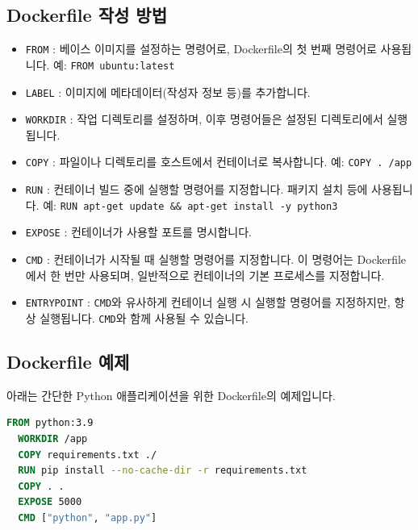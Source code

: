 \documentclass{article}
\begin{document}
\subsection*{Dockerfile 작성 방법}

\begin{itemize}
    \item \texttt{FROM} : 베이스 이미지를 설정하는 명령어로, Dockerfile의 첫 번째 명령어로 사용됩니다. 예: \texttt{FROM ubuntu:latest}
    \item \texttt{LABEL} : 이미지에 메타데이터(작성자 정보 등)를 추가합니다.
    \item \texttt{WORKDIR} : 작업 디렉토리를 설정하며, 이후 명령어들은 설정된 디렉토리에서 실행됩니다.
    \item \texttt{COPY} : 파일이나 디렉토리를 호스트에서 컨테이너로 복사합니다. 예: \texttt{COPY . /app}
    \item \texttt{RUN} : 컨테이너 빌드 중에 실행할 명령어를 지정합니다. 패키지 설치 등에 사용됩니다. 예: \texttt{RUN apt-get update \&\& apt-get install -y python3}
    \item \texttt{EXPOSE} : 컨테이너가 사용할 포트를 명시합니다.
    \item \texttt{CMD} : 컨테이너가 시작될 때 실행할 명령어를 지정합니다. 이 명령어는 Dockerfile에서 한 번만 사용되며, 일반적으로 컨테이너의 기본 프로세스를 지정합니다.
    \item \texttt{ENTRYPOINT} : \texttt{CMD}와 유사하게 컨테이너 실행 시 실행할 명령어를 지정하지만, 항상 실행됩니다. \texttt{CMD}와 함께 사용될 수 있습니다.
\end{itemize}

\subsection*{Dockerfile 예제}
아래는 간단한 Python 애플리케이션을 위한 Dockerfile의 예제입니다.

\begin{lstlisting}[language=dockerfile, caption={Python Dockerfile 예제}]
  FROM python:3.9
  WORKDIR /app
  COPY requirements.txt ./
  RUN pip install --no-cache-dir -r requirements.txt
  COPY . .
  EXPOSE 5000
  CMD ["python", "app.py"]
  \end{lstlisting}
  
\end{document}
